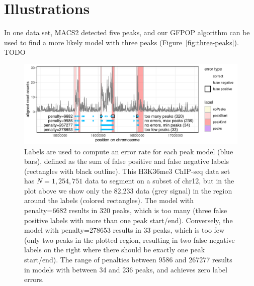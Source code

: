 \documentclass[article]{jss}
\newcommand{\fct}[1]{\code{#1()}}
\begin{document}
\section{Illustrations} \label{sec:illustrations}

In one data set, MACS2 detected five peaks, and our GFPOP
algorithm can be used to find a more likely model with three peaks
(Figure~\ref{fig:three-peaks}). TODO


\begin{figure}[t!]
\centering
\includegraphics{jss-figure-label-error}
\caption{\label{fig:label-error} Labels are used to compute an error
  rate for each peak model (blue bars), defined as the sum of false
  positive and false negative labels (rectangles with black
  outline). This H3K36me3 ChIP-seq data set has $N=1,254,751$ data to
  segment on a subset of chr12, but in the plot above we show only the
  82,233 data (grey signal) in the region around the labels (colored
  rectangles). The model with penalty=6682 results in 320 peaks, which
  is too many (three false positive labels with more than one peak
  start/end). Conversely, the model with penalty=278653 results in 33
  peaks, which is too few (only two peaks in the plotted region,
  resulting in two false negative labels on the right where there
  should be exactly one peak start/end). The range of penalties between 9586 and
  267277 results in models with between 34 and 236 peaks, and achieves
  zero label errors. }
\end{figure}
\end{document}
